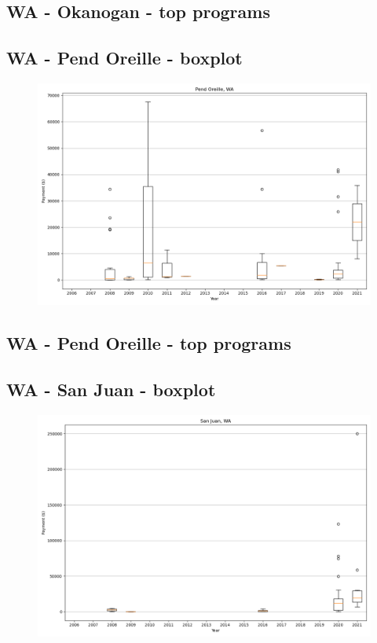 \subsection*{WA - Okanogan - top programs}

\newpage
\subsection*{WA - Pend Oreille - boxplot}
\begin{figure}[h]
\centering
\includegraphics[width=7in]{../output/boxplots/counties/Pend Oreille-WA_boxplot.png}
\end{figure}


\subsection*{WA - Pend Oreille - top programs}

\newpage
\subsection*{WA - San Juan - boxplot}
\begin{figure}[h]
\centering
\includegraphics[width=7in]{../output/boxplots/counties/San Juan-WA_boxplot.png}
\end{figure}


